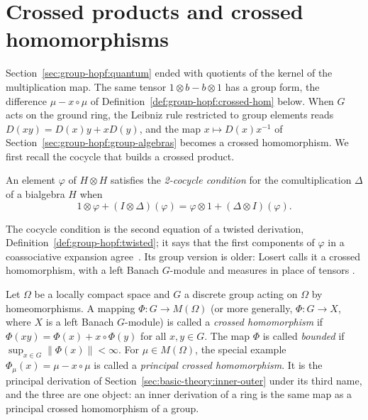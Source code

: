 \section{Crossed products and crossed homomorphisms}\label{sec:group-hopf:crossed-products}

Section~\ref{sec:group-hopf:quantum} ended with quotients of the kernel of the
multiplication map. The same tensor $1\otimes b-b\otimes 1$ has a group form,
the difference $\mu-x\circ\mu$ of Definition~\ref{def:group-hopf:crossed-hom}
below. When $G$ acts on the ground ring, the Leibniz rule restricted to group
elements reads $D(xy)=D(x)y+xD(y)$, and the map $x\mapsto D(x)x^{-1}$ of
Section~\ref{sec:group-hopf:group-algebras} becomes a crossed homomorphism. We
first recall the cocycle that builds a crossed product.

\begin{definition}\label{def:group-hopf:cocycle}
An element $\varphi$ of $H\otimes H$ satisfies the \emph{2-cocycle condition} for
the comultiplication $\Delta$ of a bialgebra $H$ when
\[
1\otimes\varphi+(I\otimes\Delta)(\varphi)=\varphi\otimes1+(\Delta\otimes I)(\varphi).
\]
\end{definition}

The cocycle condition is the second equation of a twisted derivation,
Definition~\ref{def:group-hopf:twisted}; it says that the first components of
$\varphi$ in a coassociative expansion agree~\cite[p.~222]{Losert2008}. Its group version is older:
Losert calls it a crossed homomorphism, with a left Banach $G$-module and
measures in place of tensors \cite[p.~222]{Losert2008}.

\begin{definition}\label{def:group-hopf:crossed-hom}
Let $\Omega$ be a locally compact space and $G$ a discrete group acting on $\Omega$
by homeomorphisms. A mapping $\Phi\colon G\to M(\Omega)$ (or more generally,
$\Phi\colon G\to X$, where $X$ is a left Banach $G$-module) is called a
\emph{crossed homomorphism} if $\Phi(xy)=\Phi(x)+x\circ\Phi(y)$ for all $x,y\in G$.
The map $\Phi$ is called \emph{bounded} if $\sup_{x\in G}\|\Phi(x)\|<\infty$. For
$\mu\in M(\Omega)$, the special example $\Phi_\mu(x)=\mu-x\circ\mu$ is called a
\emph{principal crossed homomorphism}. It is the principal derivation of
Section~\ref{sec:basic-theory:inner-outer} under its third name, and the three
are one object: an inner derivation of a ring is the same map as a principal
crossed homomorphism of a group.
\end{definition}

